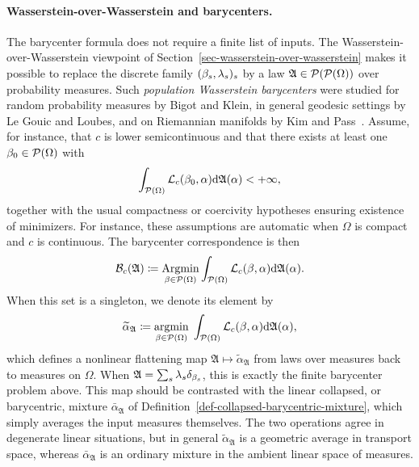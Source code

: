 \paragraph{Wasserstein-over-Wasserstein and barycenters.}
The barycenter formula does not require a finite list of inputs. The Wasserstein-over-Wasserstein viewpoint of Section~\ref{sec-wasserstein-over-wasserstein} makes it possible to replace the discrete family $(\beta_s,\lambda_s)_s$ by a law $\mathfrak A\in\mathcal{P}(\mathcal{P}(\Omega))$ over probability measures. Such \emph{population Wasserstein barycenters} were studied for random probability measures by Bigot and Klein, in general geodesic settings by Le Gouic and Loubes, and on Riemannian manifolds by Kim and Pass~\cite{bigot2012characterization,leGouic2016existence,KimPass2017WassersteinBarycenters}. Assume, for instance, that $c$ is lower semicontinuous and that there exists at least one $\beta_0\in\mathcal{P}(\Omega)$ with
\[
\int_{\mathcal{P}(\Omega)}\mathcal{L}_c(\beta_0,\alpha)\mathrm{d}\mathfrak A(\alpha)<+\infty,
\]
together with the usual compactness or coercivity hypotheses ensuring existence of minimizers. For instance, these assumptions are automatic when $\Omega$ is compact and $c$ is continuous. The barycenter correspondence is then
\[
\mathcal B_c(\mathfrak A)
\coloneqq
\operatorname*{Argmin}_{\beta\in\mathcal{P}(\Omega)}
\int_{\mathcal{P}(\Omega)}\mathcal{L}_c(\beta,\alpha)\mathrm{d}\mathfrak A(\alpha).
\]
When this set is a singleton, we denote its element by
\[
\widetilde\alpha_{\mathfrak A}
\coloneqq
\underset{\beta\in\mathcal{P}(\Omega)}{\operatorname{argmin}}\;
\int_{\mathcal{P}(\Omega)}\mathcal{L}_c(\beta,\alpha)\mathrm{d}\mathfrak A(\alpha),
\]
which defines a nonlinear flattening map $\mathfrak A\mapsto\widetilde\alpha_{\mathfrak A}$ from laws over measures back to measures on $\Omega$.
When $\mathfrak A=\sum_s\lambda_s\delta_{\beta_s}$, this is exactly the finite barycenter problem above. This map should be contrasted with the linear collapsed, or barycentric, mixture $\bar\alpha_{\mathfrak A}$ of Definition~\ref{def-collapsed-barycentric-mixture}, which simply averages the input measures themselves. The two operations agree in degenerate linear situations, but in general $\widetilde\alpha_{\mathfrak A}$ is a geometric average in transport space, whereas $\bar\alpha_{\mathfrak A}$ is an ordinary mixture in the ambient linear space of measures.

